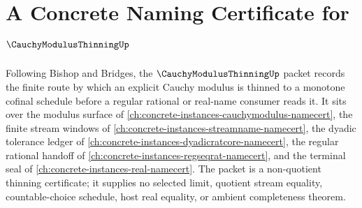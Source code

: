\chapter{A Concrete Naming Certificate for $\CauchyModulusThinningUp$}
\label{ch:concrete-instances-cauchy-modulus-thinning-namecert}

Following Bishop and Bridges, the $\CauchyModulusThinningUp$ packet records the finite route by which an explicit Cauchy modulus is thinned to a monotone cofinal schedule before a regular rational or real-name consumer reads it. It sits over the modulus surface of \autoref{ch:concrete-instances-cauchymodulus-namecert}, the finite stream windows of \autoref{ch:concrete-instances-streamname-namecert}, the dyadic tolerance ledger of \autoref{ch:concrete-instances-dyadicratcore-namecert}, the regular rational handoff of \autoref{ch:concrete-instances-regseqrat-namecert}, and the terminal seal of \autoref{ch:concrete-instances-real-namecert}. The packet is a non-quotient thinning certificate; it supplies no selected limit, quotient stream equality, countable-choice schedule, host real equality, or ambient completeness theorem.

